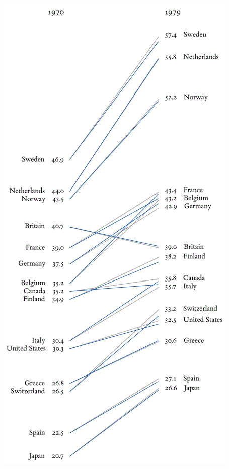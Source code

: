 \documentclass[12pt,twoside]{extarticle}
\begin{document}
\raggedright \includegraphics[]{TuftesVsMineOverlay60.png}
\newpage

\end{document}
